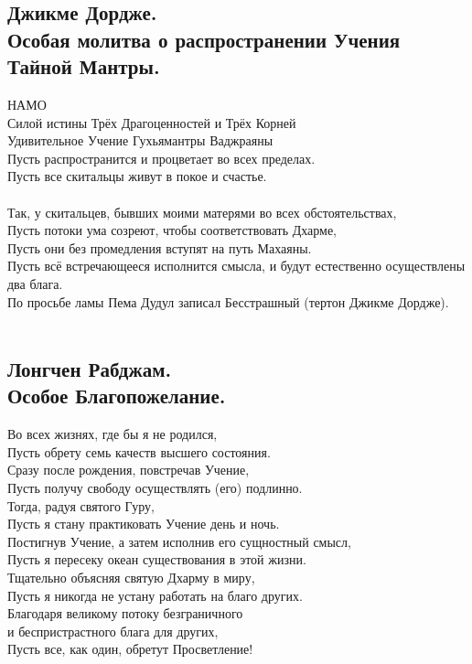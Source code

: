 \subsection{Джикме Дордже.\\Особая молитва о распространении Учения Тайной Мантры.}

НАМО\\
Силой истины Трёх Драгоценностей и Трёх Корней\\
Удивительное Учение Гухьямантры Ваджраяны\\
Пусть распространится и процветает во всех пределах.\\
Пусть все скитальцы живут в покое и счастье.\\
\\
Так, у скитальцев, бывших моими матерями во всех обстоятельствах,\\
Пусть потоки ума созреют, чтобы соответствовать Дхарме,\\
Пусть они без промедления вступят на путь Махаяны.\\
Пусть всё встречающееся исполнится смысла, и будут естественно осуществлены два блага.\\
\scriptsize
По просьбе ламы Пема Дудул записал Бесстрашный (тертон Джикме Дордже).\\
\normalsize
\\

\subsection{Лонгчен Рабджам.\\Особое Благопожелание.}

Во всех жизнях, где бы я не родился,\\
Пусть обрету семь качеств высшего состояния.\\
Сразу после рождения, повстречав Учение,\\
Пусть получу свободу осуществлять (его) подлинно.\\
Тогда, радуя святого Гуру,\\
Пусть я стану практиковать Учение день и ночь.\\
Постигнув Учение, а затем исполнив его сущностный смысл,\\
Пусть я пересеку океан существования в этой жизни.\\
Тщательно объясняя святую Дхарму в миру,\\
Пусть я никогда не устану работать на благо других.\\
Благодаря великому потоку безграничного\\
и беспристрастного блага для других,\\
Пусть все, как один, обретут Просветление!

